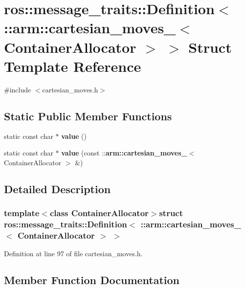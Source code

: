 \section{ros\-:\-:message\-\_\-traits\-:\-:\-Definition$<$ \-:\-:arm\-:\-:cartesian\-\_\-moves\-\_\-$<$ \-Container\-Allocator $>$ $>$ \-Struct \-Template \-Reference}
\label{structros_1_1message__traits_1_1Definition_3_01_1_1arm_1_1cartesian__moves___3_01ContainerAllocator_01_4_01_4}


{\ttfamily \#include $<$cartesian\-\_\-moves.\-h$>$}

\subsection*{\-Static \-Public \-Member \-Functions}
\begin{DoxyCompactItemize}
\item 
static const char $\ast$ {\bf value} ()
\item 
static const char $\ast$ {\bf value} (const \-::{\bf arm\-::cartesian\-\_\-moves\-\_\-}$<$ \-Container\-Allocator $>$ \&)
\end{DoxyCompactItemize}


\subsection{\-Detailed \-Description}
\subsubsection*{template$<$class Container\-Allocator$>$struct ros\-::message\-\_\-traits\-::\-Definition$<$ \-::arm\-::cartesian\-\_\-moves\-\_\-$<$ Container\-Allocator $>$ $>$}



\-Definition at line 97 of file cartesian\-\_\-moves.\-h.



\subsection{\-Member \-Function \-Documentation}
